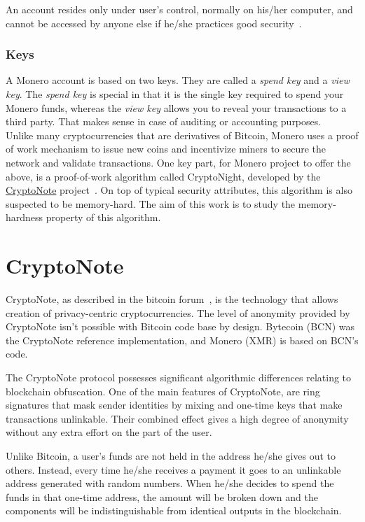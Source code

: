 An account resides only under user's control, normally on his/her computer, and cannot be accessed by anyone else if he/she practices good security~\cite{getmonero}.

\subsubsection{Keys}
A Monero account is based on two keys. They are called a \emph{spend key} and a \emph{view key}. The \emph{spend key} is special in that it is the single key required to spend your Monero funds, whereas the \emph{view key} allows you to reveal your transactions to a third party. That makes sense in case of auditing or accounting purposes.\\

Unlike many cryptocurrencies that are derivatives of Bitcoin, Monero uses a proof of work mechanism to issue new coins and incentivize miners to secure the network and validate transactions. One key part, for Monero project to offer the above, is a proof-of-work algorithm called CryptoNight, developed by the \hyperref[sec:CryptoNote]{CryptoNote} project~\cite{citeulike:14139412}. On top of typical security attributes, this algorithm is also suspected to be memory-hard. The aim of this work is to study the memory-hardness property of this algorithm.
%
\section{\label{sec:CryptoNote}CryptoNote}
CryptoNote, as described in the bitcoin forum~\cite{btcforum}, is the technology that allows creation of privacy-centric cryptocurrencies. The level of anonymity provided by CryptoNote isn't possible with Bitcoin code base by design. Bytecoin (BCN) was the CryptoNote reference implementation, and Monero (XMR) is based on BCN's code.

The CryptoNote protocol possesses significant algorithmic differences relating to blockchain obfuscation. One of the main features of CryptoNote, are ring signatures that mask sender identities by mixing and one-time keys that make transactions unlinkable. Their combined effect gives a high degree of anonymity without any extra effort on the part of the user.

Unlike Bitcoin, a user's funds are not held in the address he/she gives out to others. Instead, every time he/she receives a payment it goes to an unlinkable address generated with random numbers. When he/she decides to spend the funds in that one-time address, the amount will be broken down and the components will be indistinguishable from identical outputs in the blockchain.

